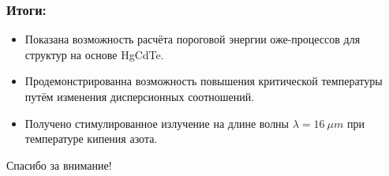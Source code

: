 \documentclass[9pt,pdf]{beamer}
\begin{document}
    \begin{frame}
        \frametitle{Итоги:}
        \begin{itemize}
            \item Показана возможность расчёта пороговой энергии 
            оже-процессов для структур на основе HgCdTe.
            \item Продемонстрированна возможность повышения
            критической температуры путём изменения дисперсионных 
            соотношений.
            \item Получено стимулированное излучение на длине 
            волны $\lambda = 16~\mu m$ при температуре 
            кипения азота. 
        \end{itemize}

        \vspace{1.5cm}

        \begin{center}
            \large{Спасибо за внимание!}
        \end{center}
    \end{frame}
\end{document}
